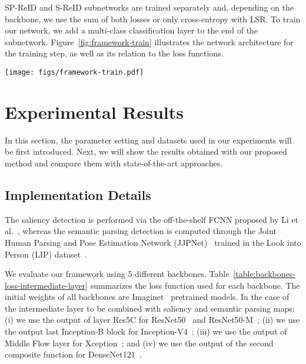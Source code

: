 \documentclass[final,3p,times,twocolumn]{elsarticle}
\begin{document}
SP-ReID and S-ReID subnetworks are trained separately and, depending on the backbone, we use the sum of both losses or only cross-entropy with LSR. To train our network, we add a multi-class classification layer to the end of the subnetwork. Figure~\ref{fig:framework-train} illustrates the network architecture for the training step, as well as its relation to the loss functions.

\begin{figure*}[!htb]
\centering
\setlength{\figw}{16.5cm}
\texttt{[image: figs/framework-train.pdf]}
\caption{Training setup for S-ReID and SP-ReID subnetworks. When training out framework, we consider triplet and cross-entropy loss functions. For the triplet loss, we take the feature vector before softmax layer and use it to compare images based on the Euclidean distance. The triplet loss may be ignored depending on the CNN backbone.}
\label{fig:framework-train}
\end{figure*}
 \section{Experimental Results}
\label{sec:results}

In this section, the parameter setting and datasets used in our experiments will be first introduced. Next, we will show the results obtained with our proposed method and compare them with state-of-the-art approaches.

\subsection{Implementation Details}

The saliency detection is performed via the off-the-shelf FCNN proposed by Li et al.~\cite{li2016deepsaliency}, whereas the semantic parsing detection is computed through the Joint Human Parsing and Pose Estimation Network (JJPNet)~\cite{Gong_2017_CVPR} trained in the Look into Person (LIP) dataset~\cite{liang2018look}.

We evaluate our framework using 5 different backbones. Table~\ref{table:backbones-loss-intermediate-layer} summarizes the loss function used for each backbone. The initial weights of all backbones are Imaginet~\cite{russakovsky2015imagenet} pretrained models. In the case of the intermediate layer to be combined with saliency and semantic parsing maps: (i) we use the output of layer Res5C for ResNet50~\cite{he2016deep} and ResNet50-M~\cite{yu2017devil}; (ii) we use the output last Inception-B block for Inception-V4~\cite{szegedy2017inception}; (iii) we use the output of Middle Flow layer for Xception~\cite{chollet2016xception}; and (iv) we use the output of the second composite function for DenseNet121~\cite{huang2017densely}.
\end{document}
